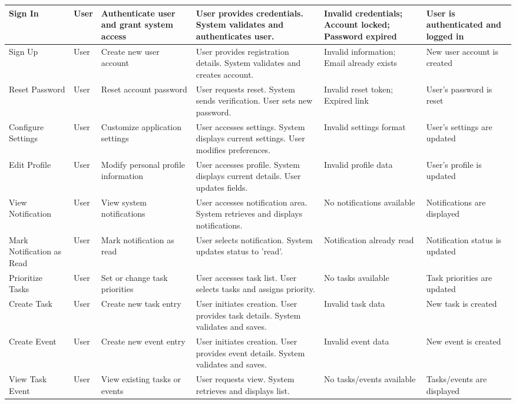 \documentclass[12pt,a4paper]{article}
\begin{document}
\begin{longtable}{|p{}|p{}|p{}|p{}|p{}|p{}|}
  Sign In & User & Authenticate user and grant system access & User provides credentials. System validates and authenticates user. & Invalid credentials; Account locked; Password expired & User is authenticated and logged in \\
  \hline
  Sign Up & User & Create new user account & User provides registration details. System validates and creates account. & Invalid information; Email already exists & New user account is created \\
  \hline
  Reset Password & User & Reset account password & User requests reset. System sends verification. User sets new password. & Invalid reset token; Expired link & User's password is reset \\
  \hline
  Configure Settings & User & Customize application settings & User accesses settings. System displays current settings. User modifies preferences. & Invalid settings format & User's settings are updated \\
  \hline
  Edit Profile & User & Modify personal profile information & User accesses profile. System displays current details. User updates fields. & Invalid profile data & User's profile is updated \\
  \hline
  View Notification & User & View system notifications & User accesses notification area. System retrieves and displays notifications. & No notifications available & Notifications are displayed \\
  \hline
  Mark Notification as Read & User & Mark notification as read & User selects notification. System updates status to 'read'. & Notification already read & Notification status is updated \\
  \hline
  Prioritize Tasks & User & Set or change task priorities & User accesses task list. User selects tasks and assigns priority. & No tasks available & Task priorities are updated \\
  \hline
  Create Task & User & Create new task entry & User initiates creation. User provides task details. System validates and saves. & Invalid task data & New task is created \\
  \hline
  Create Event & User & Create new event entry & User initiates creation. User provides event details. System validates and saves. & Invalid event data & New event is created \\
  \hline
  View Task \textbar{} Event & User & View existing tasks or events & User requests view. System retrieves and displays list. & No tasks/events available & Tasks/events are displayed \\

\end{longtable}
\end{document}
